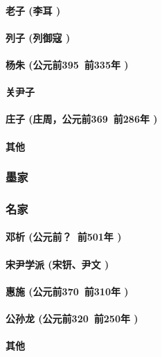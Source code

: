 \documentclass[UTF8]{../RepresentationUniverse}
\begin{document}
        \paragraph{老子 (李耳 )}
        \paragraph{列子 (列御寇 )}
        \paragraph{杨朱 (公元前395~前335年 )}
        \paragraph{关尹子}
        \paragraph{庄子 (庄周，公元前369~前286年 )}
        \paragraph{其他}

    \subsubsection{墨家}
    \subsubsection{名家}
        \paragraph{邓析 (公元前？~前501年 )}
        \paragraph{宋尹学派 (宋钘、尹文 )}
        \paragraph{惠施 (公元前370~前310年 )}
        \paragraph{公孙龙 (公元前320~前250年 )}
        \paragraph{其他}
\end{document}

